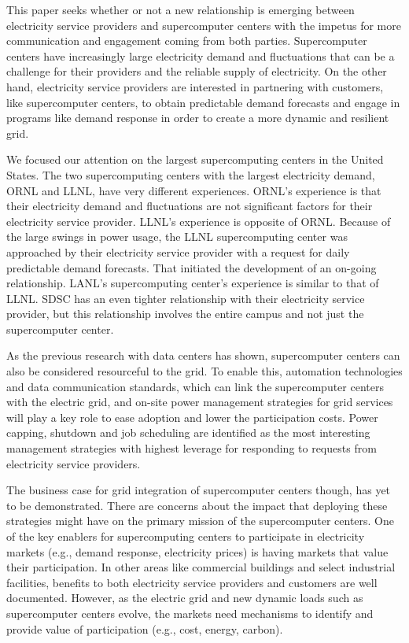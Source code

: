 This paper seeks whether or not a new relationship is emerging between electricity service providers 
and supercomputer centers with the impetus for more communication and engagement coming from both parties.  
Supercomputer centers have increasingly large electricity demand and fluctuations that can be a challenge 
for their providers and the reliable supply of electricity.  On the other hand, electricity service providers 
are interested in partnering with customers, like supercomputer centers, to obtain predictable demand 
forecasts and engage in programs like demand response in order to create a more dynamic and resilient grid.

We focused our attention on the largest supercomputing centers in the United States. The two supercomputing 
centers with the largest electricity demand, ORNL and LLNL, have very different experiences.  ORNL's 
experience is that their electricity demand and fluctuations are not significant factors for their 
electricity service provider.  LLNL's experience is opposite of ORNL.  Because of the large swings in 
power usage, the LLNL supercomputing center was approached by their electricity service provider with a 
request for daily predictable demand forecasts.   That initiated the development of an on-going relationship.  
LANL's supercomputing center's experience is similar to that of LLNL. SDSC has an even tighter relationship 
with their electricity service provider, but this relationship involves the entire campus and not just the 
supercomputer center.  

As the previous research with data centers has shown, supercomputer centers can also be considered 
resourceful to the grid. To enable this, automation technologies and data communication standards, 
which can link the supercomputer centers with the electric grid, and on-site power management strategies 
for grid services will play a key role to ease adoption and lower the participation costs.  Power capping, 
shutdown and job scheduling are identified as the most interesting management strategies with highest 
leverage for responding to requests from electricity service providers.  

The business case for grid integration of supercomputer centers though, has yet to be demonstrated.  
There are concerns about the impact that deploying these strategies might have on the primary mission 
of the supercomputer centers.  One of the key enablers for supercomputing centers to participate in 
electricity markets (e.g., demand response, electricity prices) is having markets that value their 
participation. In other areas like commercial buildings and select industrial facilities, benefits to 
both electricity service providers and customers are well documented. However, as the electric grid 
and new dynamic loads such as supercomputer centers evolve, the markets need mechanisms to identify 
and provide value of participation (e.g., cost, energy, carbon).

